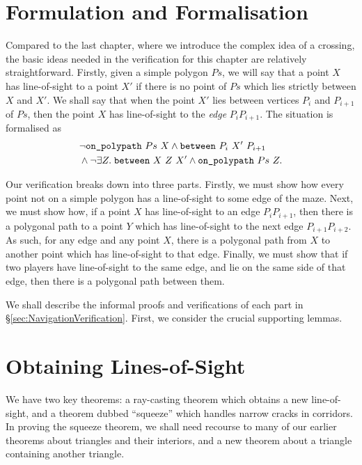 \section{Formulation and Formalisation}\label{sec:Jordan2Formulation}
Compared to the last chapter, where we introduce the complex idea of a crossing, the basic ideas needed in the verification for this chapter are relatively straightforward. Firstly, given a simple polygon $Ps$, we will say that a point $X$ has line-of-sight to a point $X'$ if there is no point of $Ps$ which lies strictly between $X$ and $X'$. We shall say that when the point $X'$ lies between vertices $P_i$ and $P_{i+1}$ of $Ps$, then the point $X$ has line-of-sight to the \emph{edge} $P_iP_{i+1}$. The situation is formalised as
\begin{displaymath}
  \begin{aligned}
    &\neg\texttt{on\_polypath}\ Ps\ X \wedge \texttt{between}\ P_i\ X'\ P_{i+1}\\
    &\wedge \neg\exists Z.\; \texttt{between}\ X\ Z\ X' \wedge \texttt{on\_polypath}\ Ps\ Z.
  \end{aligned}
\end{displaymath}

Our verification breaks down into three parts. Firstly, we must show how every point not on a simple polygon has a line-of-sight to some edge of the maze. Next, we must show how, if a point $X$ has line-of-sight to an edge $P_iP_{i+1}$, then there is a polygonal path to a point $Y$ which has line-of-sight to the next edge $P_{i+1}P_{i+2}$. As such, for any edge and any point $X$, there is a polygonal path from $X$ to another point which has line-of-sight to that edge. Finally, we must show that if two players have line-of-sight to the same edge, and lie on the same side of that edge, then there is a polygonal path between them.

We shall describe the informal proofs and verifications of each part in \S\ref{sec:NavigationVerification}. First, we consider the crucial supporting lemmas.

\section{Obtaining Lines-of-Sight}\label{sec:Jordan2Lemmas}
We have two key theorems: a ray-casting theorem which obtains a new line-of-sight, and a theorem dubbed ``squeeze'' which handles narrow cracks in corridors. In proving the squeeze theorem, we shall need recourse to many of our earlier theorems about triangles and their interiors, and a new theorem about a triangle containing another triangle.

